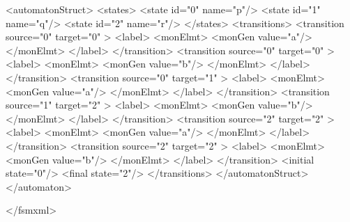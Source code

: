 {\footnotesize
\begin{listingcont}
  <automatonStruct>
    <states>
      <state  id="0"  name="p"/>
      <state  id="1"  name="q"/>
      <state  id="2"  name="r"/>
    </states>
    <transitions>
      <transition  source="0"  target="0" >
        <label>
          <monElmt>
            <monGen value="a"/>
          </monElmt>
        </label>
      </transition>
      <transition  source="0"  target="0" >
        <label>
          <monElmt>
            <monGen value="b"/>
          </monElmt>
        </label>
      </transition>
      <transition  source="0"  target="1" >
        <label>
          <monElmt>
            <monGen value="a"/>
          </monElmt>
        </label>
      </transition>
      <transition  source="1"  target="2" >
        <label>
          <monElmt>
            <monGen value="b"/>
          </monElmt>
        </label>
      </transition>
      <transition  source="2"  target="2" >
        <label>
          <monElmt>
            <monGen value="a"/>
          </monElmt>
        </label>
      </transition>
      <transition  source="2"  target="2" >
        <label>
          <monElmt>
            <monGen value="b"/>
          </monElmt>
        </label>
      </transition>
      <initial  state="0"/>
      <final    state="2"/>
    </transitions>
  </automatonStruct>
</automaton>

</fsmxml>
\end{listingcont}
}

\clearpage
